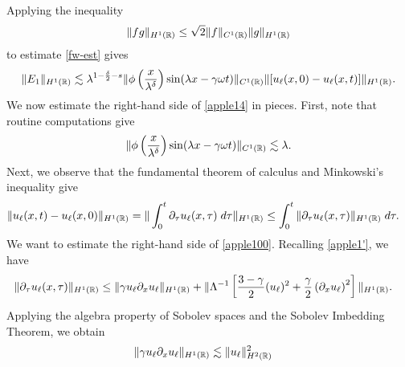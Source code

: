 %
%
Applying the inequality 
%
%
\begin{equation*}
\label{applec}
\|fg\|_{H^1(\mathbb{R})} \le \sqrt{2} \|f\|_{C^1(\mathbb{R})} \|g\|_{H^1(\mathbb{R})}
\end{equation*}
%
%
%
%
%
%
%
%
to estimate \eqref{fw-est} gives
%
%
\begin{equation}
\begin{split}
\|E_1\|_{H^1(\mathbb{R})} \lesssim \lambda^{1 - \frac{\delta}{2} -s } \|\phi
\left( \frac{x}{\lambda^\delta} \right) \sin (\lambda x - \gamma \omega t)
\|_{C^1(\mathbb{R})} \|[u_\ell (x,0) - u_\ell (x,t) ] \|_{H^1(\mathbb{R})}.
\label{apple14}
\end{split}
\end{equation}
%
%
We now estimate the right-hand side of \eqref{apple14} in pieces. First, 
note that routine computations give
%
%
\begin{equation}
\begin{split}
\|\phi\left( \frac{x}{\lambda^\delta} \right) \sin(\lambda x - \gamma 
\omega t)
\|_{C^1(\mathbb{R})}
\lesssim \lambda.
\label{apple15}
\end{split}
\end{equation}
%
%
Next, we observe that the fundamental 
theorem
of calculus and Minkowski's inequality give
%
%
%
%
\begin{equation}
\begin{split}
\|u_\ell(x,t) - u_\ell(x,0)\|_{H^1(\mathbb{R})}
& =  \| \int_0^t \partial_\tau
u_\ell(x,\tau) \; d \tau \|_{H^1(\mathbb{R})}
 \le \int_0^t \|\partial_\tau u_\ell (x,\tau) \|_{H^1(\mathbb{R})} \; d \tau.
\label{apple100}
\end{split}
\end{equation}
%
%
We want to estimate the right-hand side of \eqref{apple100}. Recalling
\eqref{apple1'}, we have
%
%
\begin{equation}
\label{apple101}
\begin{split}
 \|\partial_\tau u_\ell(x,\tau) \|_{H^1(\mathbb{R})}
& \le \|\gamma u_\ell \partial_x u_\ell \|_{H^1(\mathbb{R})}
 + \|\Lambda^{-1} \left[
\frac{3-\gamma}{2} (u_\ell)^2 + \frac{\gamma}{2} \left( \partial_x u_\ell 
\right)^2
\right] \|_{H^1(\mathbb{R})}.
\end{split}
\end{equation}
%
%
Applying the algebra property of Sobolev spaces and the Sobolev Imbedding 
Theorem, we obtain
%
%
\begin{equation*}
\begin{split}
\|\gamma u_\ell \partial_x u_\ell \|_{H^1(\mathbb{R})} &
\lesssim \|u_\ell\|_{H^2(\mathbb{R})}^2
\end{split}
\end{equation*}
